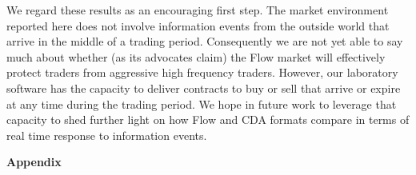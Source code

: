 \documentclass[12pt]{article}
\begin{document}
We regard these results as an encouraging first step.
The market environment reported here 
does not involve information events from the outside world that arrive 
in the middle of a trading period.
Consequently we are not yet able to say much about whether 
(as its advocates claim)
the Flow market will effectively protect traders from aggressive high frequency traders. 
However, our laboratory software has the capacity to deliver contracts to buy or sell that arrive or expire at any time during the trading period.
We hope in future work to leverage that capacity to shed further light on how Flow and CDA formats compare in terms of real time response to information events.










\pagebreak
\begin{singlespace}



\pagebreak
\end{singlespace}
\clearpage


\begin{singlespace}
\appendix
\setcounter{page}{1}
\begin{center}
    \huge \textbf{Appendix}
    
\end{center}




\end{singlespace}
\end{document}
